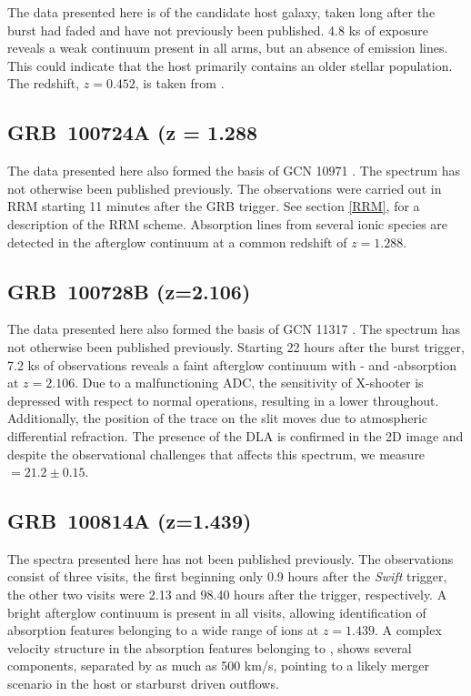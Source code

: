 \documentclass[longauth]{aa}    %
\begin{document}
The data presented here is of the candidate host galaxy, taken long after the
burst had faded and have not previously been published. 4.8 ks of exposure
reveals a weak continuum present in all arms, but an absence of emission lines.
This could indicate that the host primarily contains an older stellar
population. The redshift, $z=0.452$, is taken from \citet{Fong2013}.

\subsection{GRB~100724A (z = 1.288} \label{100724}

The data presented here also formed the basis of GCN 10971 \citep{GCN10971}. The
spectrum has not otherwise been published previously. The observations were
carried out in RRM starting 11 minutes after the GRB trigger. See section \ref{RRM},
for a description of the RRM scheme. Absorption lines from several ionic species
are detected in the afterglow continuum at a common redshift of $z = 1.288$.

\subsection{GRB~100728B (z=2.106)} \label{100728}

The data presented here also formed the basis of GCN 11317 \citep{GCN11317}. The
spectrum has not otherwise been published previously. Starting 22 hours after
the burst trigger, 7.2 ks of observations reveals a faint afterglow continuum
with \lya- and \mgii-absorption at $z=2.106$. Due to a malfunctioning ADC, the
sensitivity of X-shooter is depressed with respect to normal operations,
resulting in a lower throughout. Additionally, the position of the trace on the
slit moves due to atmospheric differential refraction. The presence of the DLA
is confirmed in the 2D image and despite the observational challenges that
affects this spectrum, we measure \nh~$=21.2 \pm 0.15$.

\subsection{GRB~100814A (z=1.439)} \label{100814}

The spectra presented here has not been published previously. The observations
consist of three visits, the first beginning only 0.9 hours after the
\textit{Swift} trigger, the other two visits were 2.13 and 98.40 hours after the
trigger, respectively. A bright afterglow continuum is present in all visits,
allowing identification of absorption features belonging to a wide range of ions
at $z=1.439$. A complex velocity structure in the absorption features belonging
to \mgii, shows several components, separated by as much as 500 km/s, pointing to
a likely merger scenario in the host or starburst driven outflows.
\end{document}
